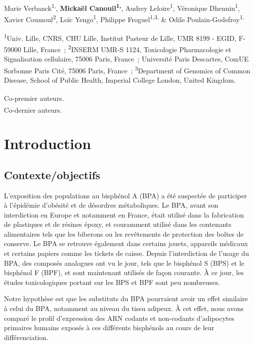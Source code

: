 \documentclass[11pt,a4paper,notrimn]{krantz}
\theoremstyle{definition}
\theoremstyle{definition}
\theoremstyle{remark}
\begin{document}
Marie Verbanck\textsuperscript{1,\textasteriskcentered}, \textbf{Mickaël
Canouil\textsuperscript{1,\textasteriskcentered}}, Audrey
Leloire\textsuperscript{1}, Véronique Dhennin\textsuperscript{1}, Xavier
Coumoul\textsuperscript{2}, Loïc Yengo\textsuperscript{1}, Philippe
Froguel\textsuperscript{1,3,\textdagger} \& Odile
Poulain-Godefroy\textsuperscript{1,\textdagger}

\footnotesize
\textsuperscript{1}Univ. Lille, CNRS, CHU Lille, Institut Pasteur de
Lille, UMR 8199 - EGID, F-59000 Lille, France~;
\textsuperscript{2}INSERM UMR-S 1124, Toxicologie Pharmacologie et
Signalisation cellulaire, 75006 Paris, France~; Université Paris
Descartes, ComUE Sorbonne Paris Cité, 75006 Paris, France~;
\textsuperscript{3}Department of Genomics of Common Disease, School of
Public Health, Imperial College London, United Kingdom.

\textsuperscript{\textasteriskcentered}Co-premier auteurs.\\
\textsuperscript{\textdagger}Co-dernier auteurs. \normalsize

\clearpage

\section{Introduction}\label{introduction-4}

\subsection{Contexte/objectifs}\label{contexteobjectifs-3}

L'exposition des populations au bisphénol A (BPA) a été suspectée de
participer à l'épidémie d'obésité et de désordres métaboliques. Le BPA,
avant son interdiction en Europe et notamment en France, était utilisé
dans la fabrication de plastiques et de résines époxy, et couramment
utilisé dans les contenants alimentaires tels que les biberons ou les
revêtements de protection des boîtes de conserve. Le BPA se retrouve
également dans certains jouets, appareils médicaux et certains papiers
comme les tickets de caisse. Depuis l'interdiction de l'usage du BPA,
des composés analogues ont vu le jour, tels que le bisphénol S (BPS) et
le bisphénol F (BPF), et sont maintenant utilisés de façon courante. À
ce jour, les études toxicologiques portant sur les BPS et BPF sont peu
nombreuses.

Notre hypothèse est que les substituts du BPA pourraient avoir un effet
similaire à celui du BPA, notamment au niveau du tissu adipeux. À cet
effet, nous avons comparé le profil d'expression des ARN codants et
non-codants d'adipocytes primaires humains exposés à ces différents
bisphénols au cours de leur différenciation.
\end{document}
